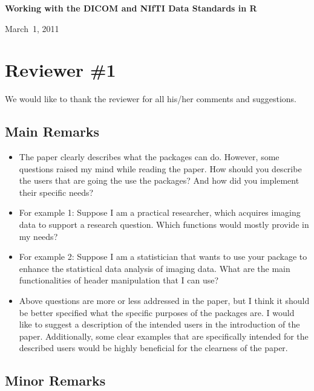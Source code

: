 \documentclass[11pt]{article}
\begin{document}

\begin{center}
{\Large \textbf{Working with the {DICOM} and {NIfTI} Data Standards in \textsf{R}}}

\bigskip

March~1, 2011

\end{center}

\section*{Reviewer \#1}

We would like to thank the reviewer for all his/her comments and
suggestions.

\subsection*{Main Remarks}

\begin{itemize}

\item The paper clearly describes what the packages can do. However,
  some questions raised my mind while reading the paper. How should
  you describe the users that are going the use the packages? And how
  did you implement their specific needs?  

\item For example 1: Suppose I am a practical researcher, which
  acquires imaging data to support a research question.  Which
  functions would mostly provide in my needs?

\item For example 2: Suppose I am a statistician that wants to use
  your package to enhance the statistical data analysis of imaging
  data.  What are the main functionalities of header manipulation that
  I can use?

\item Above questions are more or less addressed in the paper, but I
  think it should be better specified what the specific purposes of
  the packages are.  I would like to suggest a description of the
  intended users in the introduction of the paper.  Additionally, some
  clear examples that are specifically intended for the described
  users would be highly beneficial for the clearness of the paper.

\end{itemize}

\subsection*{Minor Remarks}
\end{document}
